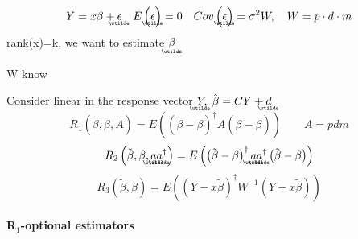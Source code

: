 \documentclass{article}
\begin{document}
\begin{equation*}
Y=x\beta +%
\underaccent{\wtilde}{\epsilon}%
\quad E\left( 
\underaccent{\wtilde}{\epsilon}%
\right) =0\quad Cov\left( 
\underaccent{\wtilde}{\epsilon}%
\right) =\sigma ^{2}W,\quad W=p\cdot d\cdot m
\end{equation*}%
rank(x)=k, we want to estimate $%
\underaccent{\wtilde}{\beta}%
$

W know

Consider linear in the response vector $%
\underaccent{\wtilde}{Y}%
,$ $\hat{\beta}=CY+%
\underaccent{\wtilde}{d}%
$%
\begin{equation*}
R_{1}\left( \tilde{\beta},\beta ,A\right) =E\left( \left( \tilde{\beta}%
-\beta \right) ^{\dagger }A\left( \tilde{\beta}-\beta \right) \right) \qquad
A=pdm
\end{equation*}%
\begin{equation*}
R_{2}\left( \tilde{\beta},\beta ,%
\underaccent{\wtilde}{a}%
\underaccent{\wtilde}{a}%
^{\dagger }\right) =E\left( \left( \tilde{\beta}-\beta \right) ^{\dagger }%
\underaccent{\wtilde}{a}%
\underaccent{\wtilde}{a}%
^{\dagger }\left( \tilde{\beta}-\beta \right) \right)
\end{equation*}%
\begin{equation*}
R_{3}\left( \tilde{\beta},\beta \right) =E\left( \left( Y-x\tilde{\beta}%
\right) ^{\dagger }W^{-1}\left( Y-x\tilde{\beta}\right) \right)
\end{equation*}

\paragraph{R$_{1}$-optional estimators}
\end{document}
